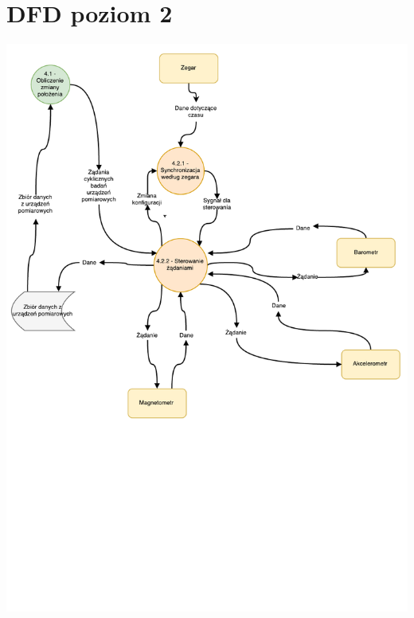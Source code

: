 \documentclass[11pt]{article}
\begin{document}
	\section{DFD poziom 2}
	\begin{center}
		\includegraphics[scale=0.8]{DFD42.pdf}
	\end{center}
\end{document}

